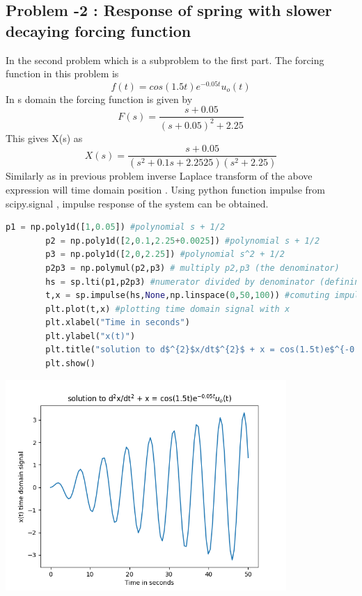 \documentclass[a4paper]{article}
\begin{document}
\subsection{Problem -2 : Response of spring with slower decaying forcing function}
In the second problem which is a subproblem to the first part. The forcing function in this problem is  
$$ f(t) = cos(1.5t)e^{-0.05t}u_{o}(t) $$
In s domain the forcing function is given by
$$ F(s) = \frac{s + 0.05}{(s + 0.05)^{2} + 2.25} $$
This gives X(s) as
$$ X(s) = \frac{s + 0.05}{(s^{2} + 0.1s + 2.2525)(s^{2} + 2.25)}$$
Similarly as in previous problem inverse Laplace transform of the above expression will time domain position . Using python function impulse from scipy.signal , impulse response of the system can be obtained. 
\begin{lstlisting}[language=Python]
p1 = np.poly1d([1,0.05]) #polynomial s + 1/2
		p2 = np.poly1d([2,0.1,2.25+0.0025]) #polynomial s + 1/2
		p3 = np.poly1d([2,0,2.25]) #polynomial s^2 + 1/2
		p2p3 = np.polymul(p2,p3) # multiply p2,p3 (the denominator)
		hs = sp.lti(p1,p2p3) #numerator divided by denominator (defining transfer funtion)
		t,x = sp.impulse(hs,None,np.linspace(0,50,100)) #comuting impulse response of the s domain transfer function
		plt.plot(t,x) #plotting time domain signal with x
		plt.xlabel("Time in seconds")
		plt.ylabel("x(t)")
		plt.title("solution to d$^{2}$x/dt$^{2}$ + x = cos(1.5t)e$^{-0.05t}u_{o}$(t)")
		plt.show()
\end{lstlisting}
\begin{center}
\includegraphics[width=0.8\textwidth]{Figure_2.png}
\end{center}
\end{document}
